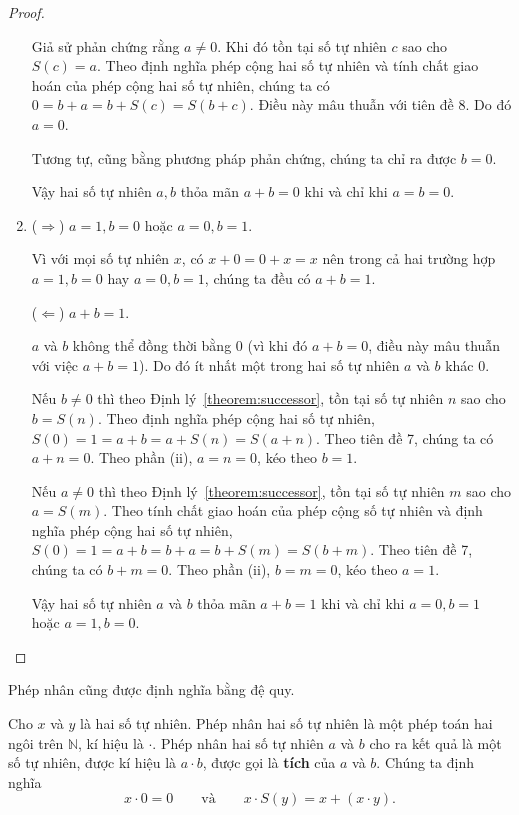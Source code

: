 \begin{proof}
\begin{enumerate}[label={(\roman*)}]
              Giả sử phản chứng rằng $a\ne 0$. Khi đó tồn tại số tự nhiên $c$ sao cho $S(c) = a$. Theo định nghĩa phép cộng hai số tự nhiên và tính chất giao hoán của phép cộng hai số tự nhiên, chúng ta có $0 = b + a = b + S(c) = S(b + c)$. Điều này mâu thuẫn với tiên đề 8. Do đó $a = 0$.

              Tương tự, cũng bằng phương pháp phản chứng, chúng ta chỉ ra được $b = 0$.

              Vậy hai số tự nhiên $a, b$ thỏa mãn $a + b = 0$ khi và chỉ khi $a = b = 0$.
        \item ($\Rightarrow$) $a = 1, b = 0$ hoặc $a = 0, b = 1$.

              Vì với mọi số tự nhiên $x$, có $x + 0 = 0 + x = x$ nên trong cả hai trường hợp $a = 1, b = 0$ hay $a = 0, b = 1$, chúng ta đều có $a + b = 1$.

              ($\Leftarrow$) $a + b = 1$.

              $a$ và $b$ không thể đồng thời bằng $0$ (vì khi đó $a + b = 0$, điều này mâu thuẫn với việc $a + b = 1$). Do đó ít nhất một trong hai số tự nhiên $a$ và $b$ khác $0$.

              Nếu $b\ne 0$ thì theo Định lý~\ref{theorem:successor}, tồn tại số tự nhiên $n$ sao cho $b = S(n)$. Theo định nghĩa phép cộng hai số tự nhiên, $S(0) = 1 = a + b = a + S(n) = S(a + n)$. Theo tiên đề 7, chúng ta có $a + n = 0$. Theo phần (ii), $a = n = 0$, kéo theo $b = 1$.

              Nếu $a\ne 0$ thì theo Định lý~\ref{theorem:successor}, tồn tại số tự nhiên $m$ sao cho $a = S(m)$. Theo tính chất giao hoán của phép cộng số tự nhiên và định nghĩa phép cộng hai số tự nhiên, $S(0) = 1 = a + b = b + a = b + S(m) = S(b + m)$. Theo tiên đề 7, chúng ta có $b + m = 0$. Theo phần (ii), $b = m = 0$, kéo theo $a = 1$.

              Vậy hai số tự nhiên $a$ và $b$ thỏa mãn $a + b = 1$ khi và chỉ khi $a = 0, b = 1$ hoặc $a = 1, b = 0$.
    \end{enumerate}
\end{proof}

Phép nhân cũng được định nghĩa bằng đệ quy.
\begin{definition}
    Cho $x$ và $y$ là hai số tự nhiên. Phép nhân hai số tự nhiên là một phép toán hai ngôi trên $\mathbb{N}$, kí hiệu là $\cdot$. Phép nhân hai số tự nhiên $a$ và $b$ cho ra kết quả là một số tự nhiên, được kí hiệu là $a\cdot b$, được gọi là \textbf{tích} của $a$ và $b$. Chúng ta định nghĩa
    \[
        x\cdot 0 = 0\qquad\text{và}\qquad x\cdot S(y) = x + (x\cdot y).
    \]
\end{definition}

